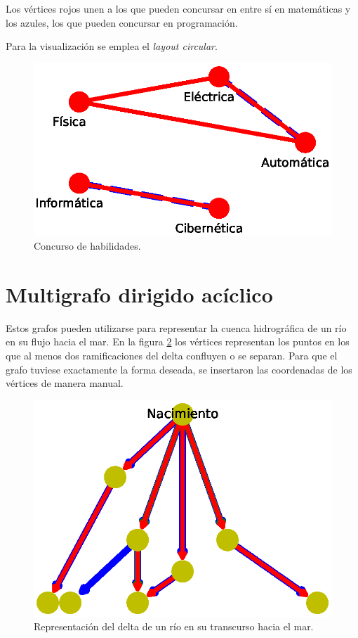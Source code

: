 \documentclass{article}
\begin{document}
Los vértices rojos unen a los que pueden concursar en entre sí en matemáticas y los azules, los que pueden concursar en programación.

Para la visualización se emplea el \textit{layout circular}.

\begin{figure}
  \includegraphics[width=.8\columnwidth]{fig9.eps}
  \vspace*{-15mm}
  \caption{Concurso de habilidades.}
  \label{Figura 9}
\end{figure}




\section{Multigrafo dirigido acíclico}

Estos grafos pueden utilizarse para representar la cuenca hidrográfica de un río en su flujo hacia el mar. En la figura \ref{Figura 10} los vértices representan los puntos en los que al menos dos ramificaciones del delta confluyen o se separan. Para que el grafo tuviese exactamente la forma deseada, se insertaron las coordenadas de los vértices de manera manual.

\begin{figure}
  \includegraphics[width=.8\columnwidth]{fig10.eps}
  \vspace*{-15mm}
  \caption{Representación del delta de un río en su transcurso hacia el mar.}
  \label{Figura 10}
\end{figure}
\end{document}
